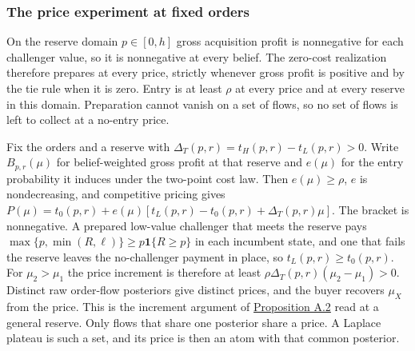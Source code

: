 
\subsubsection{The price experiment at fixed
orders}\label{the-price-experiment-at-fixed-orders}

On the reserve domain \(p\in[0,h]\) gross acquisition profit is
nonnegative for each challenger value, so it is nonnegative at every belief.
The zero-cost realization therefore prepares at every price, strictly
whenever gross profit is positive and by the tie rule when it is zero.
Entry is at least \(\rho\) at every price and at every reserve in this domain.
Preparation cannot vanish on a set of flows, so no set of flows is left
to collect at a no-entry price.

Fix the orders and a reserve with \(\Delta_T(p,r)=t_H(p,r)-t_L(p,r)>0\).
Write \(B_{p,r}(\mu)\) for belief-weighted gross profit at that reserve and
\(e(\mu)\) for the entry probability it induces under the two-point cost law.
Then \(e(\mu)\ge\rho\), \(e\) is nondecreasing, and competitive pricing gives
\(P(\mu)=t_0(p,r)+e(\mu)[t_L(p,r)-t_0(p,r)+\Delta_T(p,r)\mu]\).
The bracket is nonnegative. A prepared low-value challenger that meets the reserve
pays \(\max\{p,\min(R,\ell)\}\ge p\mathbf1\{R\ge p\}\) in each incumbent state, and
one that fails the reserve leaves the no-challenger payment in place, so
\(t_L(p,r)\ge t_0(p,r)\).
For \(\mu_2>\mu_1\) the price increment is therefore at least
\(\rho\Delta_T(p,r)(\mu_2-\mu_1)>0\).
Distinct raw order-flow posteriors give distinct prices, and the buyer
recovers \(\mu_X\) from the price. This is the increment argument of
\hyperref[result-proposition-a-2]{Proposition A.2} read at a general reserve.
Only flows that share one posterior share a price. A Laplace plateau is such a
set, and its price is then an atom with that common posterior.

